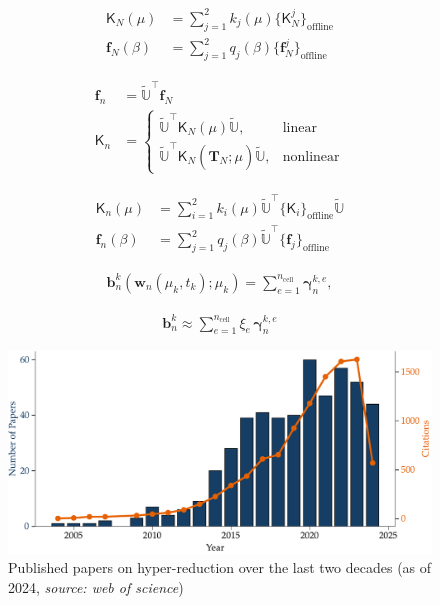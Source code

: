 \documentclass[11pt]{article}
\renewcommand{\vec}[1]{\mathbf{#1}}
\newcommand{\mat}[1]{\mathsf{#1}}
\begin{document}
\begin{align}
\mat{K}_N(\mu) &= \sum_{j=1}^2 k_j(\mu) \{\mat{K}^j_N\}_{\text{offline}} \\
\vec{f}_N(\beta) &= \sum_{j=1}^2 q_j(\beta) \{\vec{f}^j_N\}_{\text{offline}}
\end{align}

\begin{align}
\vec{f}_n &= \mathbb{\widetilde{U}}^\top \vec{f}_N
\label{eq:f_red} \\
\mat{K}_n &= 
\begin{cases} 
\mathbb{\widetilde{U}}^\top \mat{K}_N(\mu) \mathbb{\widetilde{U}}, & \text{linear}   \\ 
\mathbb{\widetilde{U}}^\top \mat{K}_N(\widehat{\vec{T}}_N ;\mu ) \mathbb{\widetilde{U}}, & \text{nonlinear}
\end{cases}
\label{eq:K_red}
\end{align}

\begin{align}
\mat{K}_{n}(\mu) &= \sum_{i=1}^2 k_i(\mu) \widetilde{\mathbb{U}}^\top\{\mat{K}_i\}_{\text{offline}}\widetilde{\mathbb{U}} \\
\vec{f}_{n}(\beta) &= \sum_{j=1}^2 q_j(\beta) \widetilde{\mathbb{U}}^\top\{\vec{f}_j\}_{\text{offline}}
\end{align}

\begin{align}
\vec{b}^{k}_n(\vec{w}_n(\mu_k, t_k); \mu_k) = \sum_{e=1}^{n_{\text{cell}}} \boldsymbol{\gamma}^{k,e}_{n},
\label{eq:bn_sum}
\end{align}

\begin{align}
\vec{b}^k_n \approx \sum_{e=1}^{n_{\text{cell}}} \xi_e\, \boldsymbol{\gamma}^{k,e}_{n}
\label{eq:bn_approx}
\end{align}

\begin{figure}[t]
	    \centering
	    \includegraphics[width=\linewidth]{top10.pdf}
	    \caption{Published papers on hyper-reduction over the last two decades (as of 2024, \textit{source: web of science})}
\label{fig:papers}
\end{figure}
\end{document}
